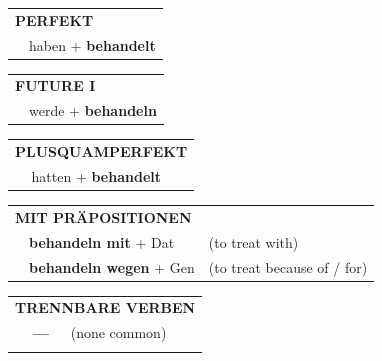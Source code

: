 \documentclass[10pt,a4paper]{revtex4-2}
\begin{document}
\begin{verbbox}
    \vspace{10pt}

 \begin{tabular}{rl}
     \multicolumn{2}{l}{\textbf{PERFEKT}}\\
   & haben + \textbf{behandelt}\\
  \end{tabular}
\hfill
   \begin{tabular}{rl}
    \multicolumn{2}{l}{\textbf{FUTURE I} }\\
   & werde + \textbf{behandeln}\\
  \end{tabular}
\hfill
   \begin{tabular}{rl}
      \multicolumn{2}{l}{\textbf{PLUSQUAMPERFEKT}}\\
   & hatten + \textbf{behandelt}\\
  \end{tabular}

   \vspace{10pt}

   \begin{tabular}{lll}
      \multicolumn{3}{l}{\textbf{MIT PRÄPOSITIONEN}}\\
& \textbf{behandeln mit} + Dat & (to treat with)\\
& \textbf{behandeln wegen} + Gen & (to treat because of / for)\\
\end{tabular}
  \hfill
   \begin{tabular}{lll}
      \multicolumn{3}{l}{\textbf{TRENNBARE VERBEN}}\\
 & \textbf{---} & (none common)\\
\vspace{10pt}
  \end{tabular}

  \vspace{-5pt}

\end{verbbox}
\end{document}

